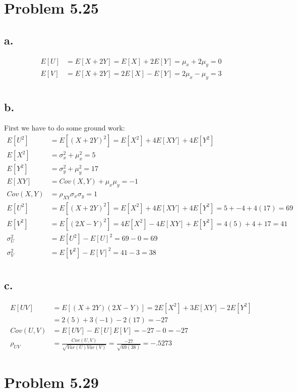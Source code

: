\documentclass[12pt]{article}
\begin{document}
\section*{Problem 5.25}
\subsection*{a.}
\begin{align*}
  E[U] &= E[X+2Y] = E[X] + 2E[Y] = \mu_x + 2\mu_y = 0 \\
  E[V] &= E[X+2Y] = 2E[X] - E[Y] = 2\mu_x - \mu_y = 3 \\
\end{align*}

\subsection*{b.}
First we have to do some ground work:
\begin{align*}
  E[U^2] &= E[(X+2Y)^2] = E[X^2] + 4E[XY] + 4E[Y^2] \\
  E[X^2] &= \sigma_x^2 + \mu_x^2 = 5 \\
  E[Y^2] &= \sigma_y^2 + \mu_y^2 = 17 \\
  E[XY] &= Cov(X,Y) + \mu_x \mu_y = -1 \\
  Cov(X,Y) &= \rho_{XY}\sigma_x \sigma_y = 1 \\
  E[U^2] &= E[(X+2Y)^2] = E[X^2] + 4E[XY] + 4E[Y^2] = 5 + -4 + 4(17) = 69 \\
  E[V^2] &= E[(2X-Y)^2] = 4E[X^2] -4E[XY] + E[Y^2] = 4(5) + 4 + 17 = 41 \\
  \sigma_U^2 &= E[U^2] - E[U]^2 = 69 - 0 = 69 \\ 
  \sigma_V^2 &= E[V^2] - E[V]^2 = 41 - 3 = 38 \\ 
\end{align*}

\subsection{c.}
\begin{align*}
  E[UV] &= E[(X+2Y)(2X-Y)] = 2E[X^2] + 3E[XY] - 2E[Y^2] \\
  &= 2(5) + 3(-1) - 2(17) = -27 \\
  Cov(U,V) &= E[UV] - E[U]E[V] = -27 - 0 = -27 \\
  \rho_{UV} &= \frac{Cov(U,V)}{\sqrt{Var(U)Var(V)}} = \frac{-27}{\sqrt{69(38)}} = -.5273
\end{align*}

\section{Problem 5.29}
\end{document}
